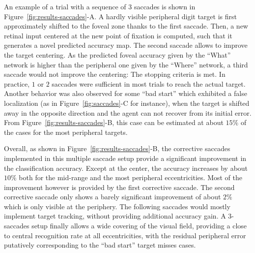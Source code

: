 An example of a trial with a sequence of 3 saccades is shown in Figure~\ref{fig:results-saccades}-A. A hardly visible peripheral digit target is first approximately shifted to the foveal zone thanks to the first saccade. Then, a new retinal input centered at the new point of fixation is computed, such that it generates a novel predicted accuracy map. The second saccade allows to improve the target centering. As the predicted foveal accuracy given by the ``What'' network is higher than the peripheral one given by the ``Where'' network, a third saccade would not improve the centering: The stopping criteria is met. In practice, $1$ or $2$ saccades were sufficient in most trials to reach the actual target. Another behavior was also observed for some ``bad start'' which exhibited a false localization (as in Figure~\ref{fig:saccades}-C for instance), when the target is shifted away in the opposite direction and the agent can not recover from its initial error. From Figure~\ref{fig:results-saccades}-B, this case can be estimated at about $15\%$ of the cases for the most peripheral targets.

Overall, as shown in Figure~\ref{fig:results-saccades}-B, the corrective saccades implemented in this multiple saccade setup provide a significant improvement in the classification accuracy. Except at the center, the accuracy increases by about $10\%$ both for the mid-range and the most peripheral eccentricities. Most of the improvement however is provided by the first corrective saccade. The second corrective saccade only shows a barely significant improvement of about $2\%$ which is only visible at the periphery. The following saccades would mostly implement target tracking, without providing additional accuracy gain. A 3-saccades setup finally allows a wide covering of the visual field, providing a close to central recognition rate at all eccentricities, with the residual peripheral error putatively corresponding to the ``bad start'' target misses cases.
